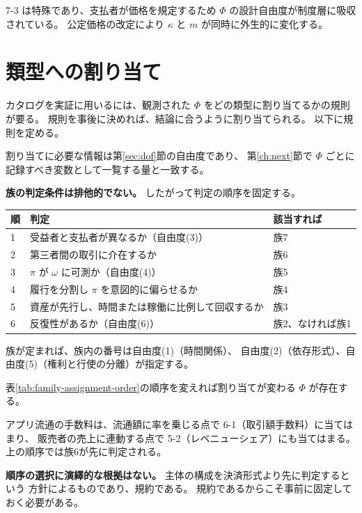 7-3 は特殊であり、支払者が価格を規定するため $\Phi$ の設計自由度が制度層に吸収されている。
公定価格の改定により $\kappa$ と $m$ が同時に外生的に変化する。

\section{類型への割り当て}
\label{sec:type-assignment}

カタログを実証に用いるには、観測された $\Phi$ をどの類型に割り当てるかの規則が要る。
規則を事後に決めれば、結論に合うように割り当てられる。
以下に規則を定める。

割り当てに必要な情報は第\ref{sec:dof}節の自由度であり、
第\ref{ch:next}節で $\Phi$ ごとに記録すべき変数として一覧する量と一致する。

\textbf{族の判定条件は排他的でない。} したがって判定の順序を固定する。

\begin{center}
\begin{tabularx}{\textwidth}{@{}llX@{}}
\toprule
順 & 判定 & 該当すれば \\
\midrule
1 & 受益者と支払者が異なるか（自由度(3)） & 族7 \\
2 & 第三者間の取引に介在するか & 族6 \\
3 & $\pi$ が $\omega$ に可測か（自由度(4)） & 族5 \\
4 & 履行を分割し $\pi$ を意図的に偏らせるか & 族4 \\
5 & 資産が先行し、時間または稼働に比例して回収するか & 族3 \\
6 & 反復性があるか（自由度(6)） & 族2、なければ族1 \\
\bottomrule
\end{tabularx}
\label{tab:family-assignment-order}
\end{center}

族が定まれば、族内の番号は自由度(1)（時間関係）、
自由度(2)（依存形式）、自由度(5)（権利と行使の分離）が指定する。

\begin{remark}[順序に依存する割り当てがある]
\label{rem:assignment-order-dependence}
表\ref{tab:family-assignment-order}の順序を変えれば割り当てが変わる $\Phi$ が存在する。

アプリ流通の手数料は、流通額に率を乗じる点で 6-1（取引額手数料）に当てはまり、
販売者の売上に連動する点で 5-2（レベニューシェア）にも当てはまる。
上の順序では族6が先に判定される。

\textbf{順序の選択に演繹的な根拠はない。} 主体の構成を決済形式より先に判定するという
方針によるものであり、規約である。
規約であるからこそ事前に固定しておく必要がある。
\end{remark}

